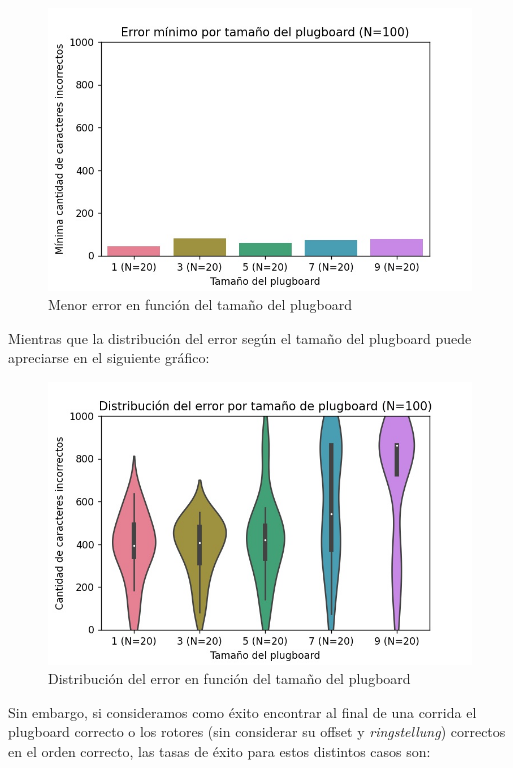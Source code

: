 \documentclass[a4paper,10pt]{article}
\begin{document}
\begin{figure}[H]
    \centering
    \includegraphics[scale=0.8]{min_error.jpg}
    \caption{Menor error en función del tamaño del plugboard}
    \label{fig:my_label}
\end{figure}

Mientras que la distribución del error según el tamaño del plugboard puede apreciarse en el siguiente gráfico:

\begin{figure}[H]
    \centering
    \includegraphics[scale=0.8]{error_dist.jpg}
    \caption{Distribución del error en función del tamaño del plugboard}
    \label{fig:my_label}
\end{figure}

Sin embargo, si consideramos como éxito encontrar al final de una corrida el plugboard correcto o los rotores (sin considerar su offset y \textit{ringstellung}) correctos en el orden correcto, las tasas de éxito para estos distintos casos son:
\end{document}
